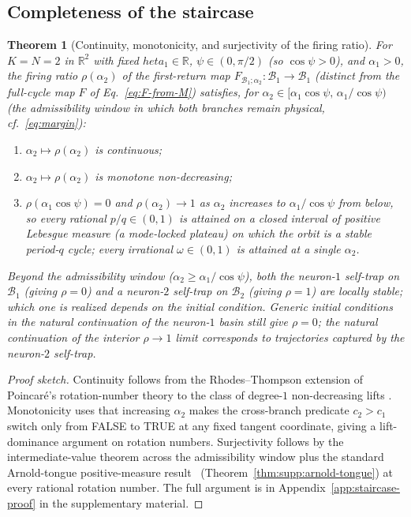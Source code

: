 \documentclass[12pt]{article}
\newcommand{\RR}{\mathbb{R}}
\newcommand{\Bsp}{\mathcal{B}}
\newtheorem{theorem}{Theorem}
\begin{document}
\subsection{Completeness of the staircase}\label{sec:completeness}
\begin{theorem}[Continuity, monotonicity, and surjectivity of the firing ratio]\label{thm:staircase}
For $K{=}N{=}2$ in $\RR^2$ with fixed $	heta_1\in\RR$, $\psi\in(0,\pi/2)$ (so $\cos\psi>0$), and $\alpha_1>0$, the firing ratio $\rho(\alpha_2)$ of the first-return map $F_{\!\Bsp_1;\alpha_2}:\Bsp_1\to\Bsp_1$ (distinct from the full-cycle map $F$ of Eq.~\eqref{eq:F-from-M}) satisfies, for $\alpha_2\in[\alpha_1\cos\psi,\,\alpha_1/\cos\psi)$ (the admissibility window in which both branches remain physical, cf.~\eqref{eq:margin}):
\begin{enumerate}[label=\textup{(\roman*)},leftmargin=*]
    \item $\alpha_2\mapsto\rho(\alpha_2)$ is continuous;
    \item $\alpha_2\mapsto\rho(\alpha_2)$ is monotone non-decreasing;
    \item $\rho(\alpha_1\cos\psi)=0$ and $\rho(\alpha_2)\to 1$ as $\alpha_2$ increases to $\alpha_1/\cos\psi$ from below, so every rational $p/q\in(0,1)$ is attained on a closed interval of positive Lebesgue measure (a mode-locked plateau) on which the orbit is a stable period-$q$ cycle; every irrational $\omega\in(0,1)$ is attained at a single $\alpha_2$.
\end{enumerate}
Beyond the admissibility window ($\alpha_2\geq\alpha_1/\cos\psi$), both the neuron-$1$ self-trap on $\Bsp_1$ (giving $\rho=0$) and a neuron-$2$ self-trap on $\Bsp_2$ (giving $\rho=1$) are locally stable; which one is realized depends on the initial condition. Generic initial conditions in the natural continuation of the neuron-$1$ basin still give $\rho=0$; the natural continuation of the interior $\rho\to 1$ limit corresponds to trajectories captured by the neuron-$2$ self-trap.
\end{theorem}

\begin{proof}[Proof sketch] Continuity follows from the Rhodes--Thompson extension of Poincar\'e's rotation-number theory to the class of degree-$1$ non-decreasing lifts \citep{rhodes1991topologies,herman1979conjugaison}. Monotonicity uses that increasing $\alpha_2$ makes the cross-branch predicate $c_2>c_1$ switch only from FALSE to TRUE at any fixed tangent coordinate, giving a lift-dominance argument on rotation numbers. Surjectivity follows by the intermediate-value theorem across the admissibility window plus the standard Arnold-tongue positive-measure result~\citep{arnold1961small} (Theorem~\ref{thm:supp:arnold-tongue}) at every rational rotation number. The full argument is in Appendix~\ref{app:staircase-proof} in the supplementary material.\end{proof}
\end{document}
